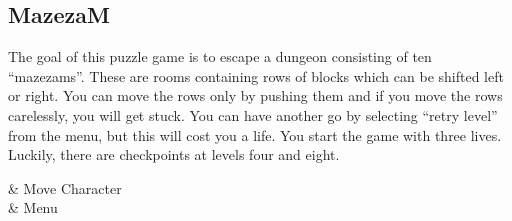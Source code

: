 \subsection{MazezaM}

The goal of this puzzle game is to escape a dungeon consisting of ten
``mazezams''.
These are rooms containing rows of blocks which can be shifted left or
right.
You can move the rows only by pushing them and if you move the rows
carelessly, you will get stuck.
You can have another go by selecting ``retry level'' from the menu,
but this will cost you a life.
You start the game with three lives.
Luckily, there are checkpoints at levels four and eight.

\begin{btnmap}
    & Move Character\\

    & Menu\\
\end{btnmap}
